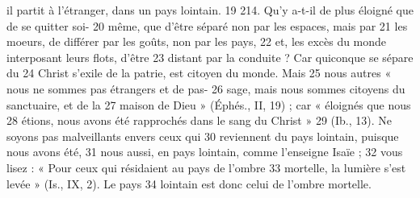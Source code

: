 il partit à l'étranger, dans un pays lointain. 
19	 	214. Qu'y a-t-il de plus éloigné que de se quitter soi-	 
20	 	même, que d'être séparé non par les espaces, mais par	 
21	 	les moeurs, de différer par les goûts, non par les pays,	 
22	 	et, les excès du monde interposant leurs flots, d'être	 
23	 	distant par la conduite ? Car quiconque se sépare du	 
24	 	Christ s'exile de la patrie, est citoyen du monde. Mais	 
25	 	nous autres « nous ne sommes pas étrangers et de pas-	 
26	 	sage, mais nous sommes citoyens du sanctuaire, et de la	 
27	 	maison de Dieu » (Éphés., II, 19) ; car « éloignés que nous	 
28	 	étions, nous avons été rapprochés dans le sang du Christ »	 
29	 	(Ib., 13). Ne soyons pas malveillants envers ceux qui	 
30	 	reviennent du pays lointain, puisque nous avons été,	 
31	 	nous aussi, en pays lointain, comme l'enseigne Isaïe ;	 
32	 	vous lisez : « Pour ceux qui résidaient au pays de l'ombre	 
33	 	mortelle, la lumière s'est levée » (Is., IX, 2). Le pays	 
34	 	lointain est donc celui de l'ombre mortelle.